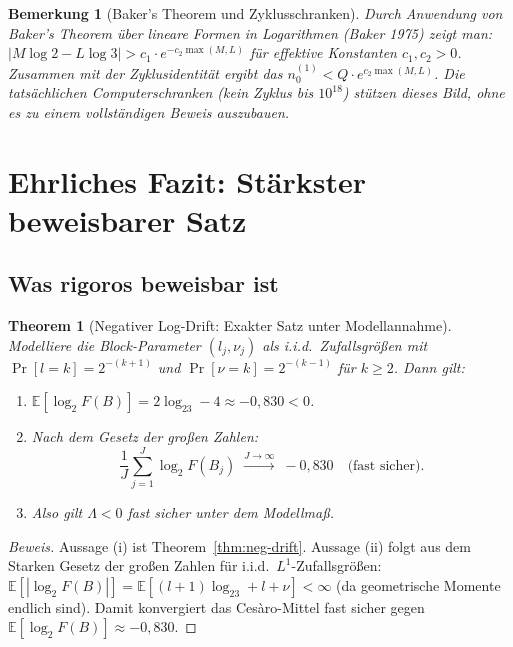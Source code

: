 \documentclass[12pt,a4paper]{article}
\newtheorem{theorem}[definition]{Theorem}
\newtheorem{bemerkung}[definition]{Bemerkung}
\newenvironment{beweis}{\begin{proof}[Beweis]}{\end{proof}}
\newcommand{\E}{\mathbb{E}}
\newcommand{\logt}{\log_2}        %
\begin{document}
\begin{bemerkung}[Baker's Theorem und Zyklusschranken]
Durch Anwendung von Baker's Theorem über lineare Formen in Logarithmen
(Baker 1975) zeigt man: $|M\log 2 - L\log 3| > c_1 \cdot e^{-c_2 \max(M,L)}$
für effektive Konstanten $c_1, c_2 > 0$. Zusammen mit der Zyklusidentität
ergibt das $n_0^{(1)} < Q \cdot e^{c_2 \max(M,L)}$.
Die tatsächlichen Computerschranken (kein Zyklus bis $10^{18}$) stützen
dieses Bild, ohne es zu einem vollständigen Beweis auszubauen.
\end{bemerkung}

\section{Ehrliches Fazit: Stärkster beweisbarer Satz}
\label{sec:fazit}

\subsection{Was rigoros beweisbar ist}

\begin{theorem}[Negativer Log-Drift: Exakter Satz unter Modellannahme]
\label{thm:hauptsatz}
Modelliere die Block-Parameter $(l_j, \nu_j)$ als i.i.d.\ Zufallsgrößen mit
$\Pr[l=k] = 2^{-(k+1)}$ und $\Pr[\nu = k] = 2^{-(k-1)}$ für $k \geq 2$.
Dann gilt:
\begin{enumerate}[label=\upshape(\roman*)]
  \item $\E[\logt F(B)] = 2\logt 3 - 4 \approx -0{,}830 < 0$.
  \item Nach dem Gesetz der großen Zahlen:
    \[
      \frac{1}{J}\sum_{j=1}^{J}\logt F(B_j)
      \;\xrightarrow{J\to\infty}\; -0{,}830 \quad \text{(fast sicher)}.
    \]
  \item Also gilt $\Lambda < 0$ fast sicher unter dem Modellmaß.
\end{enumerate}
\end{theorem}

\begin{beweis}
Aussage (i) ist Theorem~\ref{thm:neg-drift}. Aussage (ii) folgt aus dem
Starken Gesetz der großen Zahlen für i.i.d.\ $L^1$-Zufallsgrößen:
$\E[|\logt F(B)|] = \E[(l+1)\logt 3 + l + \nu] < \infty$
(da geometrische Momente endlich sind). Damit konvergiert das Cesàro-Mittel
fast sicher gegen $\E[\logt F(B)] \approx -0{,}830$.
\end{beweis}
\end{document}
